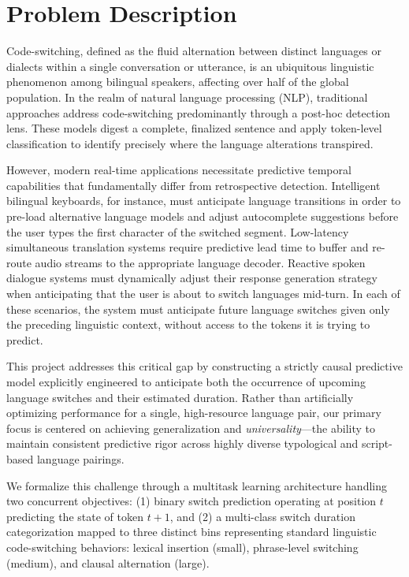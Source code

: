 \documentclass[sigconf,nonacm]{acmart}
\begin{document}
\maketitle

\section{Problem Description}

Code-switching, defined as the fluid alternation between distinct languages or dialects within a single conversation or utterance, is an ubiquitous linguistic phenomenon among bilingual speakers, affecting over half of the global population. In the realm of natural language processing (NLP), traditional approaches address code-switching predominantly through a post-hoc detection lens. These models digest a complete, finalized sentence and apply token-level classification to identify precisely where the language alterations transpired.

However, modern real-time applications necessitate predictive temporal capabilities that fundamentally differ from retrospective detection. Intelligent bilingual keyboards, for instance, must anticipate language transitions in order to pre-load alternative language models and adjust autocomplete suggestions before the user types the first character of the switched segment. Low-latency simultaneous translation systems require predictive lead time to buffer and re-route audio streams to the appropriate language decoder. Reactive spoken dialogue systems must dynamically adjust their response generation strategy when anticipating that the user is about to switch languages mid-turn. In each of these scenarios, the system must anticipate future language switches given only the preceding linguistic context, without access to the tokens it is trying to predict.

This project addresses this critical gap by constructing a strictly causal predictive model explicitly engineered to anticipate both the occurrence of upcoming language switches and their estimated duration. Rather than artificially optimizing performance for a single, high-resource language pair, our primary focus is centered on achieving generalization and \textit{universality}---the ability to maintain consistent predictive rigor across highly diverse typological and script-based language pairings.

We formalize this challenge through a multitask learning architecture handling two concurrent objectives: (1) binary switch prediction operating at position \(t\) predicting the state of token \(t+1\), and (2) a multi-class switch duration categorization mapped to three distinct bins representing standard linguistic code-switching behaviors: lexical insertion (small), phrase-level switching (medium), and clausal alternation (large).
\end{document}
